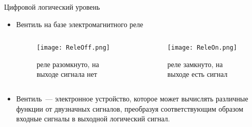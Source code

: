 \documentclass[aspectratio=169,14pt]{beamer}
\begin{document}
\begin{frame}{Цифровой логический уровень}
    \begin{itemize}
        \pause
        \item Вентиль на базе электромагнитного реле
        \pause
        \pause
        \begin{columns}[T,onlytextwidth]
            \begin{column}{0.5\textwidth}
                \begin{figure}[htp]
                    \centering
                    \texttt{[image: ReleOff.png]}
                    \caption{\tiny{реле разомкнуто, на выходе сигнала нет}}
                    \label{fig:ReleOff}
                \end{figure}
            \end{column}
            \begin{column}{0.5\textwidth}
                \begin{figure}[htp]
                    \centering
                    \texttt{[image: ReleOn.png]}
                    \caption{\tiny{реле замкнуто, на выходе есть сигнал}}
                    \label{fig:ReleOn}
                \end{figure}
            \end{column}
        \end{columns}
            \pause
        \item Вентиль~--- электронное устройство, которое может вычислять различные функции от двузначных сигналов, преобразуя соответствующим образом входные сигналы в выходной логический сигнал.
    \end{itemize}
\end{frame}
\end{document}
